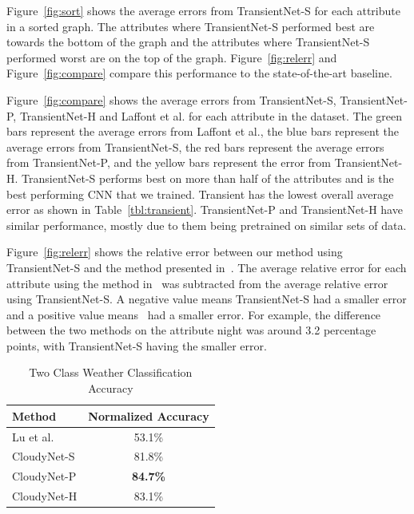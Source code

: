 \documentclass{article}
\newcommand{\figref}[1]{Figure~\ref{fig:#1}}
\newcommand{\tblref}[1]{Table~\ref{tbl:#1}}
\begin{document}
\figref{sort} shows the average errors from TransientNet-S for each attribute
in a sorted graph.  The attributes where TransientNet-S performed best are towards
the bottom of the graph and the attributes where TransientNet-S performed
worst are on the top of the graph. \figref{relerr} and \figref{compare} 
compare this performance to the state-of-the-art baseline.

\figref{compare} shows the average errors from TransientNet-S, TransientNet-P, 
TransientNet-H and Laffont et al. for each attribute in the dataset.  The green bars 
represent the average errors from Laffont et al., the blue bars represent the average 
errors from TransientNet-S, the red bars represent the average errors from TransientNet-P, 
and the yellow bars represent the error from TransientNet-H. TransientNet-S performs best on 
more than half of the attributes and is the best performing CNN that we trained.  
Transient has the lowest overall average error as shown in \tblref{transient}.  TransientNet-P
and TransientNet-H have similar performance, mostly due to them being pretrained on similar 
sets of data.

\figref{relerr} shows the relative error between our method using TransientNet-S
and the method presented in~\cite{Laffont14}.  The average relative error 
for each attribute using the method in~\cite{Laffont14} was subtracted from
the average relative error using TransientNet-S.  A negative value means TransientNet-S
had a smaller error and a positive value means~\cite{Laffont14} had a smaller
error.  For example, the difference between the two methods on the attribute
night was around 3.2 percentage points, with TransientNet-S having the smaller 
error.

 
%
%
%

\begin{table}[t]
	\centering
	\begin{tabular}{ | l | c | }
		\hline
			Method & Normalized Accuracy \\ \hline
			Lu et al.~\cite{lutwoclass}& 53.1\% \\ \hline
			CloudyNet-S & 81.8\% \\ \hline
			CloudyNet-P & \textbf{84.7\%} \\ \hline
			CloudyNet-H & 83.1\% \\ 
		\hline
	\end{tabular}
	\caption{Two Class Weather Classification Accuracy}
	\label{tbl:twoclass}
\end{table}
\end{document}
